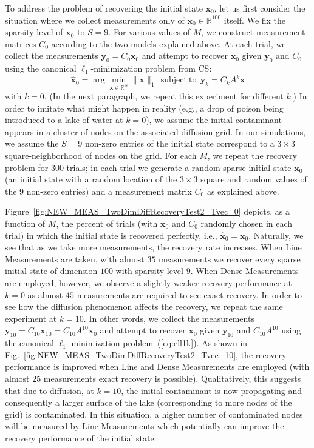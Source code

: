 \documentclass[11pt,draftcls,onecolumn]{IEEEtran}
\def\real    { \mathbb{R} }
\newcommand{\vc}[1]{\boldsymbol{#1}}
\def\real    { \mathbb{R} }
\begin{document}
To address the problem of recovering the initial state $\vc{x}_0$, let us first consider the situation where we collect measurements only of $\vc{x}_0 \in \real^{100}$ itself. We fix the sparsity level of $\vc{x}_0$ to $S = 9$.
For various values of $M$, we construct measurement matrices $C_0$ according to the two models explained above.
At each trial, we collect the measurements $\vc{y}_0 = C_0 \vc{x}_0$ and attempt to recover $\vc{x}_0$ given $\vc{y}_0$ and $C_0$ using the canonical $\ell_1$-minimization problem from CS:
\begin{equation}
\widehat{\vc{x}}_0 = \arg\min_{\vc{x} \in \real^N} \|\vc{x}\|_1 ~~\mathrm{subject~to} ~~ \vc{y}_k = C_k A^{k} \vc{x}
\label{eq:ell1k}
\end{equation}
with $k=0$. (In the next paragraph, we repeat this experiment for different $k$.)
In order to imitate what might happen in reality (e.g., a drop of poison being introduced to a lake of water at $k  = 0$), we assume the initial contaminant appears in a cluster of nodes on the associated diffusion grid. In our simulations, we assume the $S=9$ non-zero entries of the initial state correspond to a $3 \times 3$
square-neighborhood of nodes on the grid. For each $M$, we repeat the recovery problem for $300$ trials; in each trial we generate a random sparse initial state $\vc{x}_0$ (an initial state with a random location of the $3 \times 3$ square and random values of the $9$ non-zero entries) and a measurement matrix $C_0$ as explained above.

Figure~\ref{fig:NEW_MEAS_TwoDimDiffRecoveryTest2_Tvec_0} depicts, as a function of $M$, the percent of trials (with $\vc{x}_0$ and $C_0$ randomly chosen in each trial) in which the initial state is recovered perfectly, i.e., $\widehat{\vc{x}}_0 = \vc{x}_0$. Naturally, we see that as we take more measurements, the recovery rate increases.
When Line Measurements are taken, with almost $35$ measurements we recover every sparse initial state of dimension $100$ with sparsity level $9$. When Dense Measurements are employed, however, we observe a slightly weaker recovery performance at $k = 0$ as almost $45$ measurements are required to see exact recovery.
In order to see how the diffusion phenomenon affects the recovery, we repeat the same experiment at $k=10$. In other words, we collect the measurements $\vc{y}_{10} = C_{10}\vc{x}_{10} = C_{10} A^{10}\vc{x}_0$ and attempt to recover $\vc{x}_0$ given $\vc{y}_{10}$ and $C_{10}A^{10}$ using the canonical $\ell_1$-minimization problem~(\ref{eq:ell1k}). As shown in Fig.~\ref{fig:NEW_MEAS_TwoDimDiffRecoveryTest2_Tvec_10}, the recovery performance is improved when Line and Dense Measurements are employed (with almost $25$ measurements exact recovery is possible).
Qualitatively, this suggests that due to diffusion, at $k=10$, the initial contaminant is now propagating and consequently a larger surface of the lake (corresponding to more nodes of the grid) is contaminated. In this situation, a higher number of contaminated nodes will be measured by Line Measurements which potentially can improve the recovery performance of the initial state.
\end{document}
